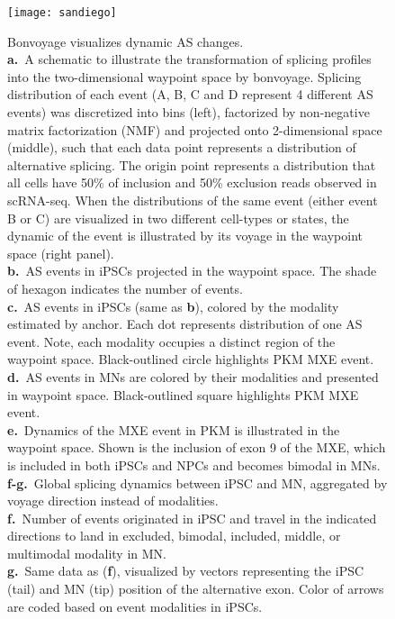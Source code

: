 \begin{figure}[h] 
  \centering
  \texttt{[image: sandiego]}
  \caption[Bonvoyage visualizes dynamic AS changes.]{Bonvoyage visualizes dynamic AS changes.\\
\textbf{a.}~A schematic to illustrate the transformation of splicing profiles into the two-dimensional waypoint space by bonvoyage. Splicing distribution of each event (A, B, C and D represent 4 different AS events) was discretized into bins (left), factorized by non-negative matrix factorization (NMF) and projected onto 2-dimensional space (middle), such that each data point represents a distribution of alternative splicing. The origin point represents a distribution that all cells have 50\% of inclusion and 50\% exclusion reads observed in scRNA-seq. When the distributions of the same event (either event B or C) are visualized in two different cell-types or states, the dynamic of the event is illustrated by its voyage in the waypoint space (right panel).\\
\textbf{b.}~AS events in iPSCs projected in the waypoint space. The shade of hexagon indicates the number of events. \\
\textbf{c.}~AS events in iPSCs (same as \textbf{b}), colored by the modality estimated by anchor. Each dot represents distribution of one AS event. Note, each modality occupies a distinct region of the waypoint space. Black-outlined circle highlights PKM MXE event.\\
\textbf{d.}~AS events in MNs are colored by their modalities and presented in waypoint space. Black-outlined square highlights PKM MXE event.\\
\textbf{e.}~Dynamics of the MXE event in PKM is illustrated in the waypoint space. Shown is the inclusion of exon 9 of the MXE, which is included in both iPSCs and NPCs and becomes bimodal in MNs.\\
\textbf{f-g.}~Global splicing dynamics between iPSC and MN, aggregated by voyage direction instead of modalities. \\
\textbf{f.}~Number of events originated in iPSC and travel in the indicated directions to land in excluded, bimodal, included, middle, or multimodal modality in MN. \\
\textbf{g.}~Same data as (\textbf{f}), visualized by vectors representing the iPSC (tail) and MN (tip) position of the alternative exon. Color of arrows are coded based on event modalities in iPSCs.
}
  \label{fig:bonvoyage_overview}
\end{figure}

